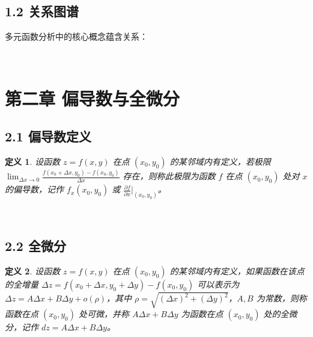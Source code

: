 \documentclass[12pt,a4paper]{article}
\newtheorem*{definition}{\heiti 定义}
\begin{document}
\subsection{1.2 关系图谱}
\begin{tcolorbox}[title={\textbf{概念关系图}},
    colback=rgba(255,255,255,0.7),
    coltitle=#1E3A5F,
    colframe=#3498DB]
多元函数分析中的核心概念蕴含关系：\begin{center}\end{center}
\end{tcolorbox}\\

\section{第二章  偏导数与全微分}
\subsection{2.1 偏导数定义}
\begin{definition}设函数 $z=f(x,y)$ 在点 $(x_0,y_0)$ 的某邻域内有定义，若极限 $\lim_{\Delta x\to0}\frac{f(x_0+\Delta x,y_0)-f(x_0,y_0)}{\Delta x}$ 存在，则称此极限为函数 $f$ 在点 $(x_0,y_0)$ 处对 $x$ 的偏导数，记作 $f_x(x_0,y_0)$ 或 $\frac{\partial f}{\partial x}\bigg|_{(x_0,y_0)}$。\end{definition}\nopagebreak\\
\subsection{2.2 全微分}
\begin{definition}设函数 $z=f(x,y)$ 在点 $(x_0,y_0)$ 的某邻域内有定义，如果函数在该点的全增量 $\Delta z=f(x_0+\Delta x,y_0+\Delta y)-f(x_0,y_0)$ 可以表示为 $\Delta z=A\Delta x+B\Delta y+o(\rho)$，其中 $\rho=\sqrt{(\Delta x)^2+(\Delta y)^2}$，$A,B$ 为常数，则称函数在点 $(x_0,y_0)$ 处可微，并称 $A\Delta x+B\Delta y$ 为函数在点 $(x_0,y_0)$ 处的全微分，记作 $dz=A\Delta x+B\Delta y$。\end{definition}\nopagebreak\\
\end{document}
